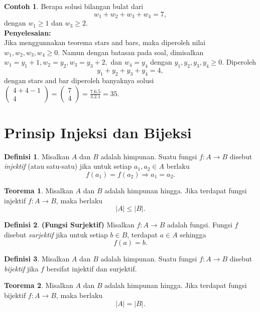 \documentclass[aspectratio=169]{beamer}
\theoremstyle{definition}
\newtheorem{definisi}{Definisi}
\newtheorem{teorema}{Teorema}
\newtheorem{contoh}{Contoh}
\begin{document}
\begin{frame}{\insertsection}{\insertsubsection}
  \begin{contoh}
    Berapa solusi bilangan bulat dari
    $$w_1+w_2+w_3+w_4=7,$$
    dengan $w_1 \geq 1$ dan $w_3 \geq 2$.\\
    \textbf{Penyelesaian:}\\
    Jika menggunnakan teorema stars and bars, maka diperoleh nilai $w_1,w_2,w_3,w_4 \geq 0.$ Namun dengan batasan pada soal, dimisalkan $w_1=y_1+1, w_2=y_2, w_3=y_3+2,$ dan $w_4=y_4$ dengan $y_1,y_2,y_3,y_4 \geq 0.$ Diperoleh
    $$y_1+y_2+y_3+y_4=4,$$
    dengan stars and bar diperoleh banyaknya solusi
    $\begin{pmatrix}
        4+4-1 \\4
      \end{pmatrix}=\begin{pmatrix}
        7 \\ 4
      \end{pmatrix}=\frac{7.6.5}{3.2.1}=35.$
  \end{contoh}
\end{frame}

\section{Prinsip Injeksi dan Bijeksi}
\begin{frame}{\insertsection}
  \begin{definisi}
    Misalkan $A$ dan $B$ adalah himpunan. Suatu fungsi $f : A \to B$ disebut
    \textit{injektif} (atau satu-satu) jika untuk setiap $a_1, a_2 \in A$ berlaku
    \[
      f(a_1) = f(a_2) \Rightarrow a_1 = a_2.
    \]
  \end{definisi}

  \begin{teorema}
    Misalkan $A$ dan $B$ adalah himpunan hingga. Jika terdapat fungsi injektif
    $f : A \to B$, maka berlaku
    \[
      |A| \leq |B|.
    \]
  \end{teorema}
\end{frame}


\begin{frame}{\insertsection}
  \begin{definisi}\textbf{(Fungsi Surjektif)}
    Misalkan $f : A \to B$ adalah fungsi. Fungsi $f$ disebut
    \textit{surjektif} jika untuk setiap $b \in B$, terdapat $a \in A$ sehingga
    \[
      f(a) = b.
    \]
  \end{definisi}

  \begin{definisi}
    Misalkan $A$ dan $B$ adalah himpunan. Suatu fungsi $f : A \to B$ disebut
    \textit{bijektif} jika $f$ bersifat injektif dan surjektif.
  \end{definisi}

  \begin{teorema}
    Misalkan $A$ dan $B$ adalah himpunan hingga. Jika terdapat fungsi bijektif
    $f : A \to B$, maka berlaku
    \[
      |A| = |B|.
    \]
  \end{teorema}
\end{frame}
\end{document}
